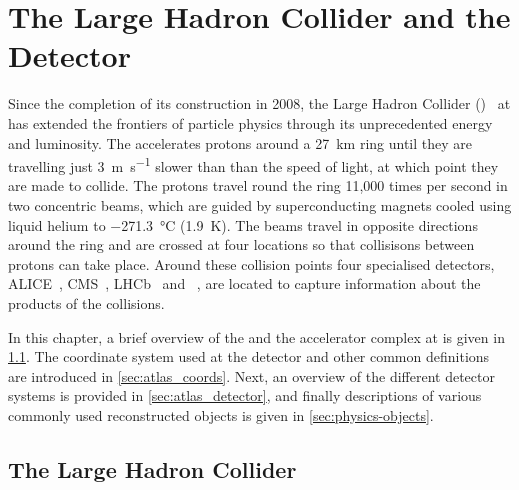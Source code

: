 \chapter{The Large Hadron Collider and the \ATLAS Detector}\label{chap:lhc_atlas}


Since the completion of its construction in 2008, the Large Hadron Collider (\LHC)~\cite{Evans:2008zzb} at \CERN has extended the frontiers of particle physics through its unprecedented energy and luminosity.
The \LHC accelerates protons around a \SI{27}{\km} ring until they are travelling just \SI{3}{\m\per\s} slower than than the speed of light, at which point they are made to collide.
The protons travel round the ring 11,000 times per second in two concentric beams, which are guided by superconducting magnets cooled using liquid helium to \SI{-271.3}{\degreeCelsius} (\SI{1.9}{\kelvin}).
The beams travel in opposite directions around the ring and are crossed at four locations so that collisisons between protons can take place.
Around these collision points four specialised detectors, ALICE~\cite{AliceCollaboration_2008}, CMS~\cite{CMS-TDR-08-001}, LHCb~\cite{LHCbCollaboration_2008} and \ATLAS~\cite{PERF-2007-01}, are located to capture information about the products of the collisions.

In this chapter, a brief overview of the \LHC and the accelerator complex at \CERN is given in \cref{sec:lhc}.
The coordinate system used at the \ATLAS detector and other common definitions are introduced in \cref{sec:atlas_coords}.
Next, an overview of the different detector systems is provided in \cref{sec:atlas_detector}, and finally descriptions of various commonly used reconstructed objects is given in \cref{sec:physics-objects}.


\section{The Large Hadron Collider}\label{sec:lhc}

